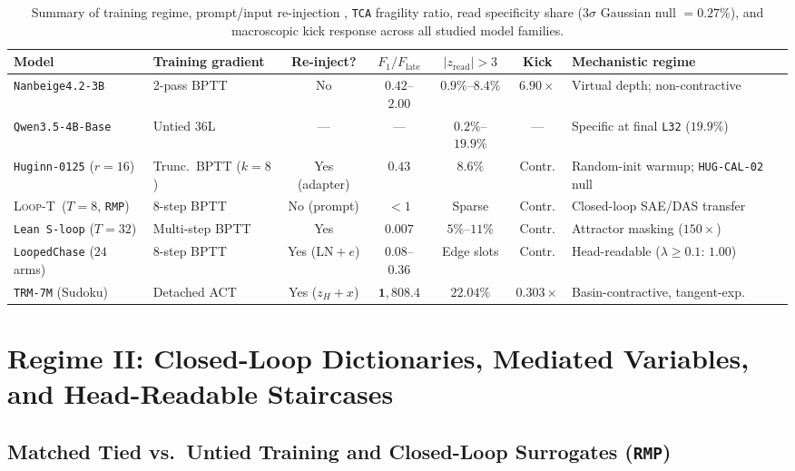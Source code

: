 \documentclass[10pt,letterpaper]{article}
\newcommand{\LoopT}{\textsc{Loop-T}}
\begin{document}
\begin{table}[t]
\centering
\small
\begin{tabularx}{\linewidth}{@{}llcccc>{\raggedright\arraybackslash}X@{}}
\toprule
Model & Training gradient & Re-inject? & $F_1 / F_{\mathrm{late}}$ & $|z_{\mathrm{read}}|{>}3$ & Kick & Mechanistic regime \\
\midrule
\texttt{Nanbeige4.2-3B} & 2-pass BPTT & No & $0.42$--$2.00$ & $0.9\%$--$8.4\%$ & $6.90\times$ & Virtual depth; non-contractive \\
\texttt{Qwen3.5-4B-Base} & Untied 36L & --- & --- & $0.2\%$--$19.9\%$ & --- & Specific at final \texttt{L32} ($19.9\%$) \\
\texttt{Huginn-0125} ($r{=}16$) & Trunc.\ BPTT ($k{=}8$) & Yes (adapter) & $0.43$ & $8.6\%$ & Contr. & Random-init warmup; \texttt{HUG-CAL-02} null \\
\LoopT\ ($T{=}8$, \texttt{RMP}) & 8-step BPTT & No (prompt) & $< 1$ & Sparse & Contr. & Closed-loop SAE/DAS transfer \\
\texttt{Lean S-loop} ($T{=}32$) & Multi-step BPTT & Yes & $0.007$ & $5\%$--$11\%$ & Contr. & Attractor masking ($150\times$) \\
\texttt{LoopedChase} ($24$ arms) & 8-step BPTT & Yes ($\mathrm{LN}{+}e$) & $0.08$--$0.36$ & Edge slots & Contr. & Head-readable ($\lambda{\ge}0.1$: $1.00$) \\
\texttt{TRM-7M} (Sudoku) & Detached ACT & Yes ($z_H{+}x$) & $\mathbf{1{,}808.4}$ & $\mathbf{22.04\%}$ & $\mathbf{0.303\times}$ & Basin-contractive, tangent-exp. \\
\bottomrule
\end{tabularx}
\caption{Summary of training regime, prompt/input re-injection \cite{olszowiec2026monitoring}, \texttt{TCA} fragility ratio, read specificity share ($3\sigma$ Gaussian null $= 0.27\%$), and macroscopic kick response across all studied model families.}
\label{tab:tca_summary}
\end{table}

\section{Regime II: Closed-Loop Dictionaries, Mediated Variables, and Head-Readable Staircases}\label{sec:regime2}

\subsection{Matched Tied vs.\ Untied Training and Closed-Loop Surrogates (\texttt{RMP})}
\end{document}
